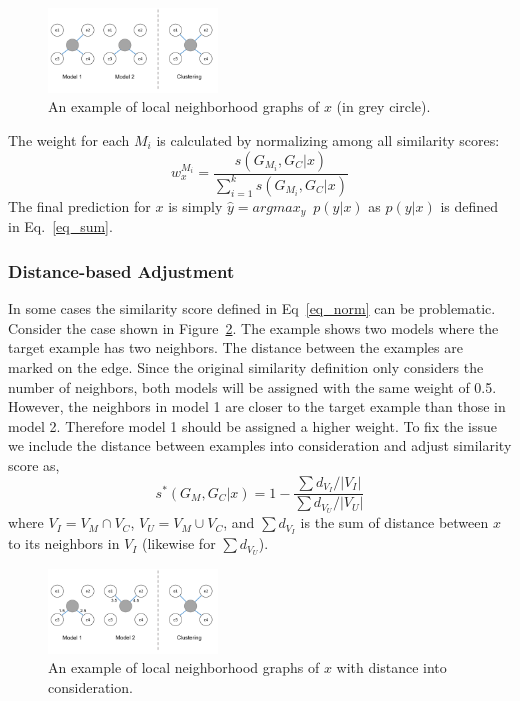 \begin{figure}[h]
\centering
    \includegraphics[width=0.4\textwidth]{./fig/lwe_graph}
\caption{An example of local neighborhood graphs of $x$ (in grey circle).}
\label{fig:graph}
\end{figure}

The weight for each $M_i$ is calculated by normalizing among all similarity scores:
\begin{equation}\label{eq_norm}
w_{x}^{M_i} = \frac {s(G_{M_i}, G_C|x)} {\sum_{i=1}^k s(G_{M_i}, G_C|x)}
\end{equation}
The final prediction for $x$ is simply $\hat y = argmax_y \enspace p(y|x)$ as $p(y|x)$ is defined in Eq.~\ref{eq_sum}.

\subsubsection{Distance-based Adjustment}
In some cases the similarity score defined in Eq~\ref{eq_norm} can be problematic. Consider the case shown in Figure~\ref{graph_dist}.
The example shows two models where the target example has two neighbors.  The distance between the examples are marked on the edge.
Since the original similarity definition only considers the number of neighbors, both models will be assigned with the same weight of 0.5.
However, the neighbors in model 1 are closer to the target example than those in model 2.  Therefore model 1 should be assigned a higher
weight.
To fix the issue we include the distance between examples into consideration and adjust similarity score as,
\begin{equation}\label{d_sim}
s^\ast(G_M, G_C|x) = 1 - \frac {\sum d_{V_I}/|V_I|} {\sum d_{V_U}/|V_U|}
\end{equation}
where $V_I = V_M \cap V_C$, $V_U = V_M \cup V_C$, and $\sum d_{V_I}$ is the sum of distance between $x$ to its neighbors in $V_I$ (likewise for $\sum d_{V_U}$).

\begin{figure}[h]
\centering
    \includegraphics[width=0.4\textwidth]{./fig/lwe_d_graph}
\caption{An example of local neighborhood graphs of $x$ with distance into consideration.}
\label{graph_dist}
\end{figure}

